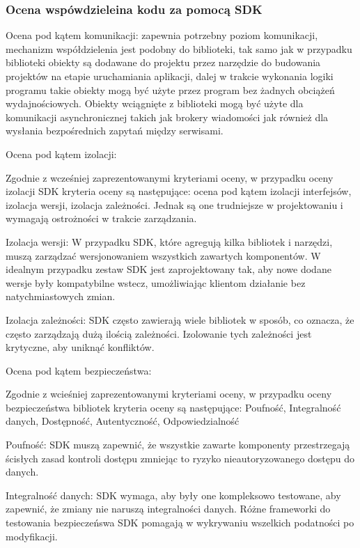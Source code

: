 \documentclass[runningheads,12pt]{llncs}
\begin{document}
\subsubsection{Ocena wspówdzieleina kodu za pomocą SDK}

Ocena pod kątem komunikacji: zapewnia potrzebny poziom komunikacji, mechanizm współdzielenia jest podobny do biblioteki, tak samo jak w przypadku biblioteki obiekty są dodawane do projektu przez narzędzie do budowania projektów na etapie uruchamiania aplikacji, dalej w trakcie wykonania logiki programu takie obiekty mogą być użyte przez program bez żadnych obciążeń wydajnościowych. Obiekty wciągnięte z biblioteki mogą być użyte dla komunikacji asynchronicznej takich jak brokery wiadomości jak również dla wysłania bezpośrednich zapytań między serwisami.

Ocena pod kątem izolacji: 

Zgodnie z wcześniej zaprezentowanymi kryteriami oceny, w przypadku oceny izolacji SDK kryteria oceny są następujące: ocena pod kątem izolacji interfejsów, izolacja wersji, izolacja zależności. Jednak są one trudniejsze w projektowaniu i wymagają ostrożności w trakcie zarządzania. ~\cite[p. 75]{EssentialIan}

Izolacja wersji: W przypadku SDK, które agregują kilka bibliotek i narzędzi, muszą zarządzać wersjonowaniem wszystkich zawartych komponentów. W idealnym przypadku zestaw SDK jest zaprojektowany tak, aby nowe dodane wersje były kompatybilne wstecz, umożliwiając klientom działanie bez natychmiastowych zmian.

Izolacja zależności: SDK często zawierają wiele bibliotek w sposób, co oznacza, że często zarządzają dużą ilością zależności. Izolowanie tych zależności jest krytyczne, aby uniknąć konfliktów. ~\cite[p. 218]{martin2008clean}

Ocena pod kątem bezpieczeństwa: 

Zgodnie z wcieśniej zaprezentowanymi kryteriami oceny, w przypadku oceny bezpieczeństwa bibliotek kryteria oceny są następujące: Poufność, Integralność danych, Dostępność, Autentyczność, Odpowiedzialność

Poufność: SDK muszą zapewnić, że wszystkie zawarte komponenty przestrzegają ścisłych zasad kontroli dostępu zmniejąc to ryzyko nieautoryzowanego dostępu do danych.  ~\cite[para 4]{azure2020}

Integralność danych: SDK wymaga, aby były one kompleksowo testowane, aby zapewnić, że zmiany nie naruszą integralności danych. Różne frameworki do testowania bezpieczeńswa SDK pomagają w wykrywaniu wszelkich podatności po modyfikacji.  ~\cite[para 5]{azure2020}
\end{document}
